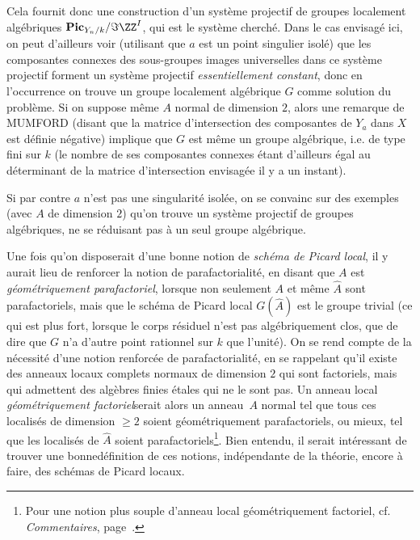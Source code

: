Cela fournit donc une construction d'un syst\`eme projectif de groupes localement alg\'ebriques $\mathbf{Pic}_{Y_n/k}/\Im \ZZ^I$, qui est le syst\`eme cherch\'e. Dans le cas envisag\'e ici, on peut d'ailleurs voir (utilisant que $a$ est un point singulier isol\'e) que les composantes connexes des sous-groupes images universelles dans ce syst\`eme projectif forment un syst\`eme projectif \emph{essentiellement constant}, donc en l'occurrence on trouve un groupe localement alg\'ebrique $G$ comme solution du probl\`eme. Si on suppose m\^eme $A$ normal de dimension $2$, alors une remarque de MUMFORD (disant que la matrice d'intersection des composantes de $Y_{a}$ dans $X$ est d\'efinie n\'egative) implique que $G$ est m\^eme un groupe alg\'ebrique, i.e. de type fini sur $k$ (le nombre de ses composantes connexes \'etant d'ailleurs \'egal au d\'eterminant de la matrice d'intersection envisag\'ee il y a un instant).

Si par contre $a$ n'est pas une singularit\'e isol\'ee, on se convainc sur des exemples (avec $A$ de dimension $2$) qu'on trouve un syst\`eme projectif de groupes alg\'ebriques, ne se r\'eduisant pas \`a un seul groupe alg\'ebrique.

\label{pXIII20}%
Une fois qu'on disposerait d'une bonne notion de \og \emph{schéma de Picard local}\fg, il y aurait lieu de renforcer la notion de parafactorialit\'e, en disant que $A$ est \og \emph{géométriquement parafactoriel}\fg, lorsque non seulement $A$ et m\^eme $\widehat{A}$ sont parafactoriels, mais que le sch\'ema de Picard local $G(\widehat{A})$ est le groupe trivial (ce qui est plus fort, lorsque le corps r\'esiduel n'est pas alg\'ebriquement clos, que de dire que $G$ n'a d'autre point rationnel sur $k$ que l'unit\'e). On se rend compte de la n\'ecessit\'e d'une notion renforc\'ee de parafactorialit\'e, en se rappelant qu'il existe des anneaux locaux complets normaux de dimension $2$ qui sont factoriels, mais qui admettent des alg\`ebres finies \'etales qui ne le sont pas. Un anneau local \og \emph{géométriquement factoriel}\fg serait alors un anneau~$A$ normal tel que tous ces localis\'es de dimension $\geq 2$ soient g\'eom\'etriquement parafactoriels, ou mieux, tel que les localis\'es de $\widehat{A}$ soient parafactoriels\footnote{Pour une notion plus souple d'anneau local \og g\'eom\'etriquement factoriel\fg, cf. \emph{Commentaires}, page~\pageref{commpara}.}. Bien entendu, il serait int\'eressant de trouver une \og bonne\fg d\'efinition de ces notions, ind\'ependante de la th\'eorie, encore \`a faire, des sch\'emas de Picard locaux.

